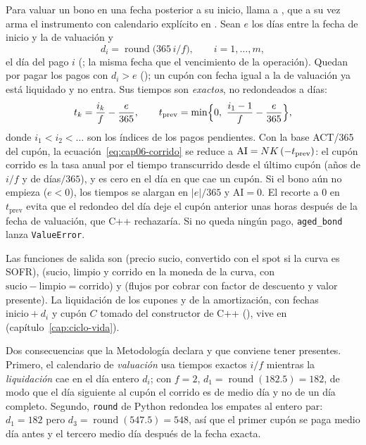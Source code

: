 Para valuar un bono en una fecha posterior a su inicio,  llama a
, que a su vez arma el instrumento con calendario explícito en
. Sean $e$ los días entre la fecha de inicio y la de valuación y
\begin{equation}\label{eq:cap06-dias-pago}
  d_i=\operatorname{round}\!\bigl(365\,i/f\bigr),\qquad i=1,\dots,m,
\end{equation}
el día del pago $i$ (; la misma fecha que el vencimiento de la operación).
Quedan por pagar los pagos con $d_i>e$ (); un cupón con fecha
igual a la de valuación ya está liquidado y no entra. Sus tiempos son \emph{exactos}, no redondeados a días:
\begin{equation}\label{eq:cap06-tiempos-envejecido}
  t_k=\frac{i_k}{f}-\frac{e}{365},\qquad
  t_{\mathrm{prev}}=\min\Bigl\{0,\ \frac{i_1-1}{f}-\frac{e}{365}\Bigr\},
\end{equation}
donde $i_1<i_2<\dots$ son los índices de los pagos pendientes. Con la base ACT/365 del cupón,
la ecuación~\eqref{eq:cap06-corrido} se reduce a $\mathrm{AI}=NK\,(-t_{\mathrm{prev}})$: el cupón corrido es
la tasa anual por el tiempo transcurrido desde el último cupón (años de $i/f$ y de días$/365$), y es cero en el
día en que cae un cupón. Si el bono aún no empieza ($e<0$), los tiempos se alargan en $|e|/365$ y
$\mathrm{AI}=0$. El recorte a $0$ en $t_{\mathrm{prev}}$ evita que el redondeo del día deje el cupón anterior
unas horas después de la fecha de valuación, que C++ rechazaría. Si no queda ningún pago, \texttt{aged\_bond}
lanza \texttt{ValueError}.

Las funciones de salida son  (precio sucio, convertido con el spot si la
curva es SOFR),  (sucio, limpio y corrido en la moneda de la curva, con
$\text{sucio}-\text{limpio}=\text{corrido}$) y  (flujos por cobrar
con factor de descuento y valor presente). La liquidación de los cupones y de la amortización, con fechas
$\text{inicio}+d_i$ y cupón $C$ tomado del constructor de C++
(), vive en 
(capítulo~\ref{cap:ciclo-vida}).

Dos consecuencias que la Metodología declara y que conviene tener presentes. Primero, el calendario de
\emph{valuación} usa tiempos exactos $i/f$ mientras la \emph{liquidación} cae en el día entero $d_i$; con
$f=2$, $d_1=\operatorname{round}(182.5)=182$, de modo que el día siguiente al cupón el corrido es de medio día
y no de un día completo. Segundo, \texttt{round} de Python redondea los empates al entero par:
$d_1=182$ pero $d_3=\operatorname{round}(547.5)=548$, así que el primer cupón se paga medio día antes y el tercero
medio día después de la fecha exacta.

